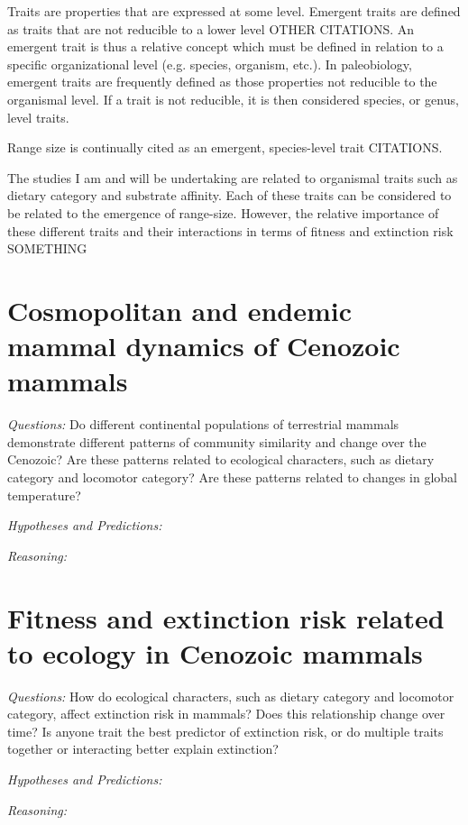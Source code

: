 \documentclass[12pt,letterpaper]{article}
\begin{document}
Traits are properties that are expressed at some level. Emergent traits are defined as traits that are not reducible to a lower level \citep{Jablonski2008a}OTHER CITATIONS. An emergent trait is thus a relative concept which must be defined in relation to a specific organizational level (e.g. species, organism, etc.). In paleobiology, emergent traits are frequently defined as those properties not reducible to the organismal level. If a trait is not reducible, it is then considered species, or genus, level traits.

Range size is continually cited as an emergent, species-level trait CITATIONS. 

The studies I am and will be undertaking are related to organismal traits such as dietary category and substrate affinity. Each of these traits can be considered to be related to the emergence of range-size. However, the relative importance of these different traits and their interactions in terms of fitness and extinction risk SOMETHING


\section{Cosmopolitan and endemic mammal dynamics of Cenozoic mammals}

\textit{Questions:} Do different continental populations of terrestrial mammals demonstrate different patterns of community similarity and change over the Cenozoic? Are these patterns related to ecological characters, such as dietary category and locomotor category? Are these patterns related to changes in global temperature?

\textit{Hypotheses and Predictions:}

\textit{Reasoning:}


\section{Fitness and extinction risk related to ecology in Cenozoic mammals}

\textit{Questions:} How do ecological characters, such as dietary category and locomotor category, affect extinction risk in mammals? Does this relationship change over time? Is anyone trait the best predictor of extinction risk, or do multiple traits together or interacting better explain extinction?

\textit{Hypotheses and Predictions:}

\textit{Reasoning:}
\end{document}
